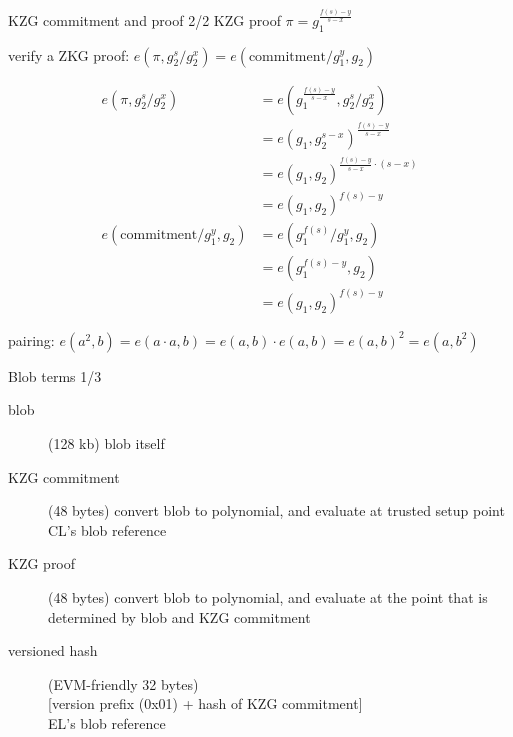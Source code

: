 \documentclass[10pt]{beamer}
\begin{document}
\begin{frame}[fragile]{KZG commitment and proof 2/2}
KZG proof $\pi = g_1^\frac{f(s) - y}{s - x}$

verify a ZKG proof: $e(\pi, g_2^s / g_2^x) = e(\text{commitment} / g_1^y, g_2)$

\begin{align*} 
e(\pi, g_2^s / g_2^x) &= e(g_1^\frac{f(s) - y}{s - x}, g_2^s / g_2^x) \\
 &= e(g_1,  g_2^{s - x})^\frac{f(s) - y}{s - x} \\
 &= e(g_1, g_2)^{\frac{f(s) - y}{s - x} \cdot (s - x)} \\
 &= e(g_1, g_2)^{f(s) - y} \\
e(\text{commitment} / g_1^y, g_2) &= e(g_1^{f(s)} / g_1^y, g_2) \\
 &= e(g_1^{f(s) - y}, g_2) \\
 &= e(g_1, g_2)^{f(s) - y}
\end{align*}

pairing: $e(a^2, b) = e(a\cdot a, b) = e(a, b)\cdot e(a, b) = e(a, b)^2 = e(a, b^2)$
\end{frame}

\begin{frame}[fragile]{Blob terms 1/3}
\begin{description}
  \item[blob] (128 kb) blob itself
  \item[KZG commitment] (48 bytes) convert blob to polynomial,
    and evaluate at trusted setup point \\ CL's blob reference
  \item[KZG proof] (48 bytes) convert blob to polynomial,
    and evaluate at the point that is determined by
    blob and KZG commitment
  \item[versioned hash] (EVM-friendly 32 bytes) \\
    {[version prefix (0x01) + hash of KZG commitment]} \\
    EL's blob reference
\end{description}
\end{frame}
\end{document}
